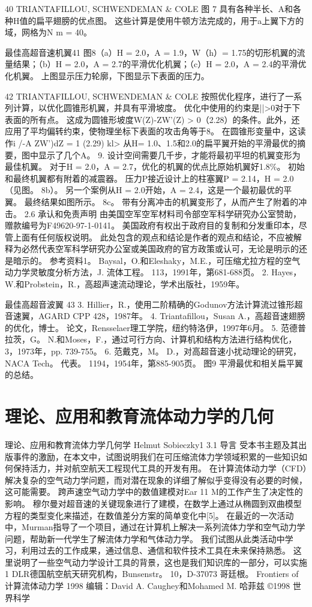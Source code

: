 \documentclass[UTF8,11pt,a4paper,openany,fontset=fandol]{ctexbook}
\begin{document}
40 TRIANTAFILLOU, SCHWENDEMAN \& COLE 图 7 具有各种半长、A和各种H值的扁平翅膀的优点图。 这些计算是使用牛顿方法完成的，用于a上翼下方的域，网格为N m = 40。

最佳高超音速机翼41 图8（a）H = 2.0，A = 1.9，W（h）= 1.75的切形机翼的流量结果；（b）H = 2.0，A = 2.7的平滑优化机翼；（c）H = 2.0，A = 2.4的平滑优化机翼。 上图显示压力轮廓，下图显示下表面的压力。

42 TRIANTAFILLOU, SCHWENDEMAN \& COLE 按照优化程序，进行了一系列计算，以优化圆锥形机翼，并具有平滑坡度。 优化中使用的约束是||>0对于下表面的所有点。 这成为圆锥形坡度W(Z)-ZW'(Z) > 0（2.28）的条件。此外，还应用了平均偏转约束，使物理坐标下表面的攻击角等于8。 在圆锥形变量中，这读作i /-A ZW')dZ = 1 (2.29) kl> 从H= 1.0、1.5和2.0的扁平翼开始的平滑最优的摘要，图中显示了几个A。 9. 设计空间需要几千步，才能将最初平坦的机翼变形为最佳机翼。 对于H = 2.0，A = 2.7，优化的机翼的优点比原始机翼好1.8\%。 初始和最终机翼都有附着的减震器。 压力P接近设计上的柱塞翼P = 2.14，H = 2.0（见图。 8b）。 另一个案例从H = 2.0开始，A = 2.4，这是一个最初最优的平翼。 最终结果如图所示。 8c。 带有分离冲击的机翼变形了，从而产生了附着的冲击。 2.6 承认和免责声明 由美国空军空军材料司令部空军科学研究办公室赞助，赠款编号为F49620-97-1-0141。 美国政府有权出于政府目的复制和分发重印本，尽管上面有任何版权说明。 此处包含的观点和结论是作者的观点和结论，不应被解释为必然代表空军科学研究办公室或美国政府的官方政策或认可，无论是明示的还是暗示的。 参考资料1。 Baysal，O.和Eleshaky，M.E.，可压缩尤拉方程的空气动力学灵敏度分析方法，J. 流体工程。 113，1991年，第681-688页。 2. Hayes，W.和Probstein，R.，高超声速流动理论，学术出版社，1959年。

最佳高超音波翼 43 3. Hillier，R.，使用二阶精确的Godunov方法计算流过锥形超音速翼，AGARD CPP 428，1987年。 4. Triantafillou，Susan A.，高超音速翅膀的优化，博士。 论文，Rensselaer理工学院，纽约特洛伊，1997年6月。 5. 范德普拉茨，G。 N.和Moses，F.，通过可行方向、计算机和结构方法进行结构优化，3，1973年，pp. 739-755。 6. 范戴克，M。 D.，对高超音速小扰动理论的研究，NACA Tech。 代表。 1194，1954年，第885-905页。 图9 平滑最优和相关扁平翼的总结。

\clearpage
\chapter{理论、应用和教育流体动力学的几何}
理论、应用和教育流体力学几何学 Helmut Sobieczky1 3.1 导言 受本书主题及其出版事件的激励，在本文中，试图说明我们在可压缩流体力学领域积累的一些知识如何保持活力，并对航空航天工程现代工具的开发有用。 在计算流体动力学（CFD）解决复杂的空气动力学问题，而对潜在现象的详细了解似乎变得没有必要的时候，这可能需要。 跨声速空气动力学中的数值建模对Ear 11 M的工作产生了决定性的影响。 穆尔曼对超音速的关键现象进行了建模，在数学上通过从椭圆到双曲模型方程的类型变化来描述，在数值差分方案的简单变化中[5]。 在最近的一次活动中，Murman指导了一个项目，通过在计算机上解决一系列流体力学和空气动力学问题，帮助新一代学生了解流体力学和气体动力学。 我们试图从此类活动中学习，利用过去的工作成果，通过信息、通信和软件技术工具在未来保持熟悉。 这里说明了一些空气动力学设计工具的背景，这也是我们知识库的一部分，可以实施1 DLR德国航空航天研究机构，Bunsenstr。 10，D-37073 哥廷根。 Frontiers of 计算流体动力学 1998 编辑：David A. Caughey和Mohamed M. 哈菲兹 ©1998 世界科学
\end{document}
